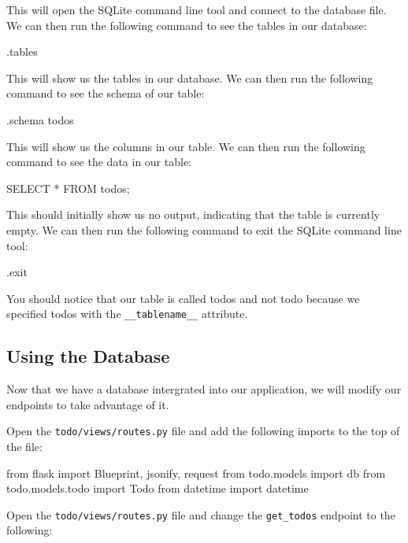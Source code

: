 \documentclass{csse4400}
\begin{document}
This will open the SQLite command line tool and connect to the database file.
We can then run the following command to see the tables in our database:

\begin{code}[language=sql,numbers=none]{}
  .tables
\end{code}

This will show us the tables in our database.
We can then run the following command to see the schema of our table:

\begin{code}[language=sql,numbers=none]{}
  .schema todos
\end{code}

This will show us the columns in our table.
We can then run the following command to see the data in our table:

\begin{code}[language=sql,numbers=none]{}
  SELECT * FROM todos;
\end{code}

This should initially show us no output, indicating that the table is currently empty.
We can then run the following command to exit the SQLite command line tool:

\begin{code}[language=sql,numbers=none]{}
  .exit
\end{code}

You should notice that our table is called todos and not todo because we specified todos with the \texttt{\_\_tablename\_\_} attribute.


\subsection{Using the Database}

Now that we have a database intergrated into our application,
we will modify our endpoints to take advantage of it. 

Open the \texttt{todo/views/routes.py} file and add the following imports to the top of the file:

\begin{code}[language=python,numbers=none]{}
from flask import Blueprint, jsonify, request
from todo.models import db
from todo.models.todo import Todo
from datetime import datetime
\end{code}

Open the \texttt{todo/views/routes.py} file and change the \texttt{get\_todos} endpoint to the following:
\end{document}

